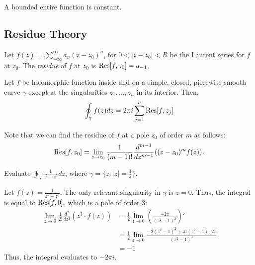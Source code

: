 \begin{corollary}[Liouville]
    A bounded entire function is constant.
\end{corollary}

\subsection{Residue Theory}


\begin{df}
    Let $f(z) = \sum \limits_{-\infty}^{\infty} a_n(z - z_0)^n$, for $0 < |z - z_0| < R$
    be the Laurent series for $f$ at $z_0$. The \emph{residue} of $f$ at $z_0$ is $\operatorname{Res} [f, z_0] = a_{-1}$.
\end{df}

\begin{theorem}
    Let $f$ be holomorphic function inside and on a simple, closed, 
    piecewise-smooth curve $\gamma$ except at the singularities $z_1, \dots, z_n$ in its interior. 
    Then,
    \[
    \oint_{\gamma} f(z) dz = 2 \pi i \sum \limits_{j = 1}^n \operatorname{Res} [f, z_j]
    \]
\end{theorem}

\begin{remark}
    Note that we can find the residue of $f$ at a pole $z_0$ of order $m$ as follows:
    \[
    \operatorname{Res} [f, z_0] = \lim \limits_{z \rightarrow z_0} \frac{1}{(m - 1)!} \frac{d^{m - 1}}{dz^{m - 1}} ((z - z_0)^{m}f(z)).
    \]
\end{remark}

\begin{exercise}
    Evaluate $\oint_{\gamma} \frac{1}{z^5 - z^3} dz$, where 
    $\gamma = \{ z \colon |z| = \frac{1}{2} \}$.
\end{exercise}
\begin{solution}
    Let $f(z) = \frac{1}{z^5 - z^3}$. The only relevant singularity in $\gamma$ is $z = 0$. 
    Thus, the integral is equal to $\operatorname{Res}[f,0]$, which is a pole of order $3$:
    \begin{align*}
    \lim_{z\rightarrow0} \frac{1}{2!}\frac{d^2}{dz^2} \left(z^3 \cdot f(z)\right)
    &= \frac{1}{2} \lim_{z \rightarrow 0} \left(\frac{-2z}{(z^2-1)^2}\right)' \\
    &= \frac{1}{2} \lim_{z \rightarrow 0} \frac{-2(z^2 - 1)^2 +4z(z^2 - 1)\cdot 2z}{(z^2-1)^4} \\\
    &= -1
    \end{align*}
    Thus, the integral evaluates to $-2\pi i$.
\end{solution}

